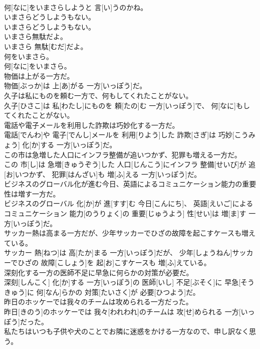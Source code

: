\documentclass[8pt]{extreport}
\begin{document}
\begin{CJK}{UTF8}{min}
\\	何[なに]をいまさらしようと 言[い]うのかね。
\\	いまさらどうしようもない。	
\\	いまさらどうしようもない。
\\	いまさら無駄だよ。	
\\	いまさら 無駄[むだ]だよ。
\\	何をいまさら。	
\\	何[なに]をいまさら。
\\	物価は上がる一方だ。	
\\	物価[ぶっか]は 上[あ]がる 一方[いっぽう]だ。
\\	久子は私にものを頼む一方で、何もしてくれたことがない。	
\\	久子[ひさこ]は 私[わたし]にものを 頼[たの]む 一方[いっぽう]で、 何[なに]もしてくれたことがない。
\\	電話や電子メールを利用した詐欺は巧妙化する一方だ。	
\\	電話[でんわ]や 電子[でんし]メールを 利用[りよう]した 詐欺[さぎ]は 巧妙[こうみょう] 化[か]する 一方[いっぽう]だ。
\\	この市は急増した人口にインフラ整備が追いつかず、犯罪も増える一方だ。	
\\	この 市[し]は 急増[きゅうぞう]した 人口[じんこう]にインフラ 整備[せいび]が 追[お]いつかず、 犯罪[はんざい]も 増[ふ]える 一方[いっぽう]だ。
\\	ビジネスのグローバル化が進む今日、英語によるコミュニケーション能力の重要性は増す一方だ。	
\\	ビジネスのグローバル 化[か]が 進[すす]む 今日[こんにち]、 英語[えいご]によるコミュニケーション 能力[のうりょく]の 重要[じゅうよう] 性[せい]は 増[ま]す 一方[いっぽう]だ。
\\	サッカー熱は高まる一方だが、少年サッカーでひざの故障を起こすケースも増えている。	
\\	サッカー 熱[ねつ]は 高[たか]まる 一方[いっぽう]だが、 少年[しょうねん]サッカーでひざの 故障[こしょう]を 起[お]こすケースも 増[ふ]えている。
\\	深刻化する一方の医師不足に早急に何らかの対策が必要だ。	
\\	深刻[しんこく] 化[か]する 一方[いっぽう]の 医師[いし] 不足[ぶそく]に 早急[そうきゅう]に 何[なん]らかの 対策[たいさく]が 必要[ひつよう]だ。
\\	昨日のホッケーでは我々のチームは攻められる一方だった。	
\\	昨日[きのう]のホッケーでは 我々[われわれ]のチームは 攻[せ]められる 一方[いっぽう]だった。
\\	私たちはいつも子供や犬のことでお隣に迷惑をかける一方なので、申し訳なく思う。	

\end{CJK}
\end{document}
